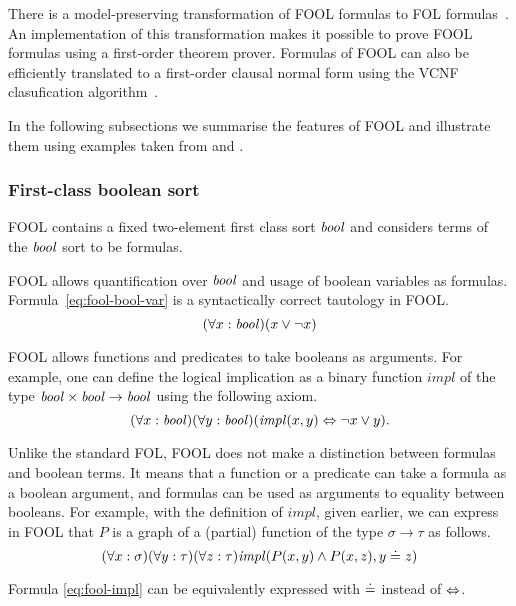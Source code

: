 \documentclass{easychair}
\begin{document}
There is a model-preserving transformation of FOOL formulas to FOL
formulas~\cite{KKV15}. An implementation of this transformation makes it
possible to prove FOOL formulas using a first-order theorem prover. Formulas of
FOOL can also be efficiently translated to a first-order clausal normal form
using the VCNF clasufication algorithm~\cite{KK+16-GCAI}.

In the following subsections we summarise the features of FOOL and illustrate
them using examples taken from \cite{KK+16} and \cite{KKV18}.

\subsubsection{First-class boolean sort}
FOOL contains a fixed two-element first class sort $\mathit{bool}$ and considers terms
of the $\mathit{bool}$ sort to be formulas.

FOOL allows quantification over $\mathit{bool}$ and usage of boolean variables as
formulas. Formula~\ref{eq:fool-bool-var} is a syntactically correct tautology
in FOOL.
\begin{equation}\label{eq:fool-bool-var}
(\forall x:\mathit{bool})(x \lor \neg x)
\end{equation}

FOOL allows functions and predicates to take booleans as arguments. For
example, one can define the logical implication as a binary function
$\mathit{impl}$ of the type $\mathit{bool} \times \mathit{bool} \to \mathit{bool}$ using the following
axiom.
\begin{equation}\label{eq:fool-impl}
(\forall x:\mathit{bool})(\forall y:\mathit{bool})(\mathit{impl}(x,y) \Leftrightarrow \neg x \lor y).
\end{equation}

Unlike the standard FOL, FOOL does not make a distinction between formulas and
boolean terms. It means that a function or a predicate can take a formula as a
boolean argument, and formulas can be used as arguments to equality between
booleans. For example, with the definition of $\mathit{impl}$, given earlier,
we can express in FOOL that $P$ is a graph of a (partial) function of the type
$\sigma \to \tau$ as follows.
\begin{equation}\label{eq:bool-arg-example}
(\forall x:\sigma)(\forall y:\tau)(\forall z:\tau)
\mathit{impl}(P(x,y) \land P(x,z), y \doteq z)
\end{equation}

Formula \ref{eq:fool-impl} can be equivalently expressed with $\doteq$ instead of
$\Leftrightarrow$.
\end{document}
